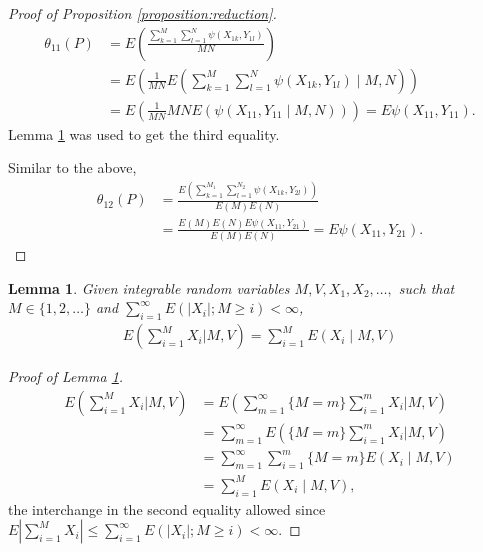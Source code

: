 \documentclass[12pt]{article}
\DeclareMathOperator{\AUC}{AUC}
\newcommand{\E}{E}
\renewcommand{\P}{P}
\newcommand{\cind}{\perp \!\!\! \perp}
\newcommand{\aucindiv}{\theta_{11}}%
\newcommand{\aucpop}{\theta_{12}}%
\newcommand{\kernel}{\psi}
\newtheorem{lemma}[theorem]{Lemma}
\begin{document}
\begin{proof}[Proof of Proposition \ref{proposition:reduction}]
  \begin{align}
    \aucindiv(\P) &= \E\left(\frac{\sum_{k=1}^M\sum_{l=1}^N\kernel(X_{1k},Y_{1l})}{MN}\right)\\
                  &=\E\left(\frac{1}{MN}\E\left(\sum_{k=1}^M\sum_{l=1}^N\kernel(X_{1k},Y_{1l}) \mid M,N\right)\right)\\
                  &=\E\left(\frac{1}{MN}MN\E(\kernel(X_{11},Y_{11}\mid M,N))\right) = \E\kernel(X_{11},Y_{11}).                    
  \end{align}
  Lemma \ref{lemma:conditional wald} was used to get the third equality.

  Similar to the above,
  \begin{align}
    \aucpop(\P) &= \frac{\E\left(\sum_{k=1}^{M_1}\sum_{l=1}^{N_2}\kernel(X_{1k},Y_{2l})\right)}{\E(M)\E(N)}\\
    &=\frac{\E(M)\E(N)\E\kernel(X_{11},Y_{21})}{\E(M)\E(N)} = \E\kernel(X_{11},Y_{21}).
  \end{align}
\end{proof}


\begin{lemma}\label{lemma:conditional wald}
  Given integrable random variables $M,V,X_1,X_2,\ldots,$ such that $M\in\{1,2,\ldots\}$ and $\sum_{i=1}^\infty E(|X_i|;M\ge i)<\infty$,
  \begin{align}
    \E\left(\sum_{i=1}^M X_i \bigg\vert M,V\right) = \sum_{i=1}^M \E(X_i\mid M,V)
  \end{align}
\end{lemma}
\begin{proof}[Proof of Lemma \ref{lemma:conditional wald}]
  \begin{align}
    \E\left(\sum_{i=1}^M X_i\bigg\vert M,V\right)
    &=  \E\left(\sum_{m=1}^\infty\{M=m\}\sum_{i=1}^m X_i\bigg\vert M,V\right)\\
    &= \sum_{m=1}^\infty \E\left(\{M=m\}\sum_{i=1}^m X_i\bigg\vert M,V\right)\\
    &=\sum_{m=1}^\infty \sum_{i=1}^m\{M=m\}\E(X_i\mid M,V)\\
    &=\sum_{i=1}^M\E(X_i\mid M,V),
  \end{align}
the interchange in the second equality allowed since $E\left|\sum_{i=1}^MX_i\right| \le \sum_{i=1}^\infty E(|X_i|;M\ge i)<\infty.$
\end{proof}
\end{document}
